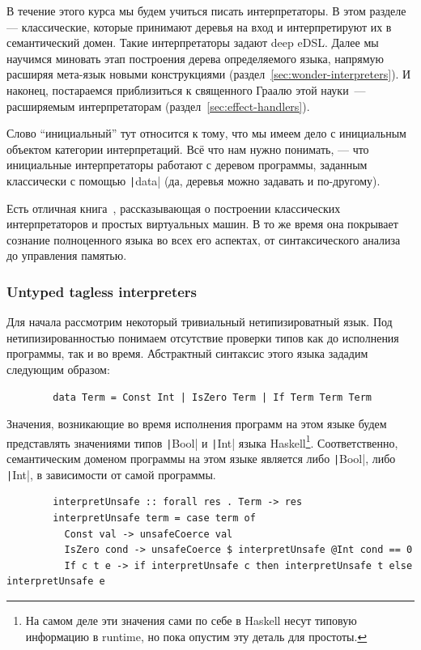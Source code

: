 \documentclass[12pt]{article}
\begin{document}
    В течение этого курса мы будем учиться писать интерпретаторы.
    В этом разделе --- классические, которые принимают деревья на вход и интерпретируют их в семантический домен.
    Такие интерпретаторы задают deep eDSL\@.
    Далее мы научимся миновать этап построения дерева определяемого языка, напрямую расширяя мета-язык новыми конструкциями (раздел~\ref{sec:wonder-interpreters}).
    И наконец, постараемся приблизиться к священного Граалю этой науки~--- расширяемым интерпретаторам (раздел~\ref{sec:effect-handlers}).

    Слово ``инициальный'' тут относится к тому, что мы имеем дело с инициальным объектом категории интерпретаций.
    Всё что нам нужно понимать, --- что инициальные интерпретаторы работают с деревом программы, заданным классически с помощью \texttt|data| (да, деревья можно задавать и по-другому).

    Есть отличная книга~\cite{nystrom2021crafting}, рассказывающая о построении классических интерпретаторов и простых виртуальных машин.
    В то же время она покрывает сознание полноценного языка во всех его аспектах, от синтаксического анализа до управления памятью.

    \subsubsection{Untyped tagless interpreters}

    Для начала рассмотрим некоторый тривиальный нетипизироватный язык.
    Под нетипизированностью понимаем отсутствие проверки типов как до исполнения программы, так и во время.
    Абстрактный синтаксис этого языка зададим следующим образом:
    \begin{verbatim}
        data Term = Const Int | IsZero Term | If Term Term Term
    \end{verbatim}

    Значения, возникающие во время исполнения программ на этом языке будем представлять значениями типов \texttt|Bool| и \texttt|Int| языка Haskell\footnote{На самом деле эти значения сами по себе в Haskell несут типовую информацию в runtime, но пока опустим эту деталь для простоты.}.
    Соответственно, семантическим доменом программы на этом языке является либо \texttt|Bool|, либо \texttt|Int|, в зависимости от самой программы.
    \begin{verbatim}
        interpretUnsafe :: forall res . Term -> res
        interpretUnsafe term = case term of
          Const val -> unsafeCoerce val
          IsZero cond -> unsafeCoerce $ interpretUnsafe @Int cond == 0
          If c t e -> if interpretUnsafe c then interpretUnsafe t else interpretUnsafe e
    \end{verbatim}
\end{document}
